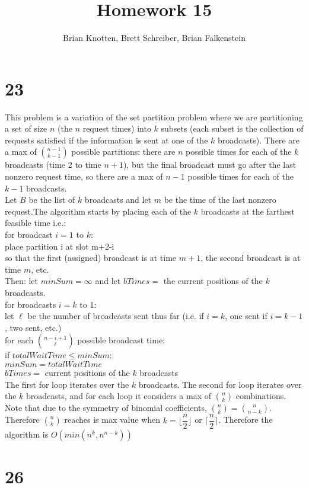 \documentclass[letterpaper,notitlepage,twoside]{article}
\newcommand\tab[1][1cm]{\hspace*{#1}} %
\begin{document}
\title{Homework 15}
\author{Brian Knotten, Brett Schreiber, Brian Falkenstein}
\maketitle

\section*{23}
This problem is a variation of the set partition problem where we are partitioning a set of size $n$ (the $n$ request times) into $k$ subsets (each subset is the collection of requests satisfied if the information is sent at one of the $k$ broadcasts). There are a max of ${n-1 \choose k-1}$ possible partitions: there are $n$ possible times for each of the $k$ broadcasts (time 2 to time $n+1$), but the final broadcast must go after the last nonzero request time, so there are a max of $n-1$ possible times for each of the $k-1$ broadcasts.\\
Let $B$ be the list of $k$ broadcasts and let $m$ be the time of the last nonzero request.The algorithm starts by placing each of the $k$ broadcasts at the farthest feasible time i.e.: \\
for broadcast $i = 1$ to $k$:\\
\tab place partition i at slot m+2-i\\
so that the first (assigned) broadcast is at time $m+1$, the second broadcast is at time $m$, etc. \\
Then: let $minSum = \infty$ and let $bTimes =$ the current positions of the $k$ broadcasts. \\
for broadcasts $i = k$ to 1:\\
\tab let $\ell$ be the number of broadcasts sent thus far (i.e. if $i = k$, one sent if $i=k-1$, two sent, etc.)\\
\tab for each ${n-i+1 \choose \ell}$ possible broadcast time:\\
\tab\tab if $totalWaitTime \leq minSum$:\\
\tab\tab\tab $minSum = totalWaitTime$\\
\tab\tab\tab $bTimes =$ current positions of the $k$ broadcasts\\
The first for loop iterates over the $k$ broadcasts. The second for loop iterates over the $k$ broadcasts, and for each loop it considers a max of ${n \choose k}$ combinations. Note that due to the symmetry of binomial coefficients, ${n \choose k} = {n \choose n-k}$. Therefore ${n \choose k}$ reaches is max value when $k = \lfloor\dfrac{n}{2}\rfloor$ or $\lceil\dfrac{n}{2}\rceil$. Therefore the algorithm is $O(min(n^{k}, n^{n-k}))$
\section*{26}
\end{document}
